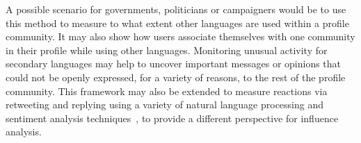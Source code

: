 \documentclass{llncs}
\begin{document}
A possible scenario for governments, politicians or campaigners would
be to use this method to measure to what extent other languages are
used within a profile community. It may also show how users associate
themselves with one community in their profile while using other
languages. Monitoring unusual activity for secondary languages may
help to uncover important messages or opinions that could not be
openly expressed, for a variety of reasons, to the rest of the profile
community. This framework may also be extended to measure reactions
via retweeting and replying using a variety of natural language
processing and sentiment analysis
techniques~\cite{oatley+crick:2014,sluban-et-al:2015,mostafa-et-al-ai2016},
to provide a different perspective for influence analysis.





\end{document}
